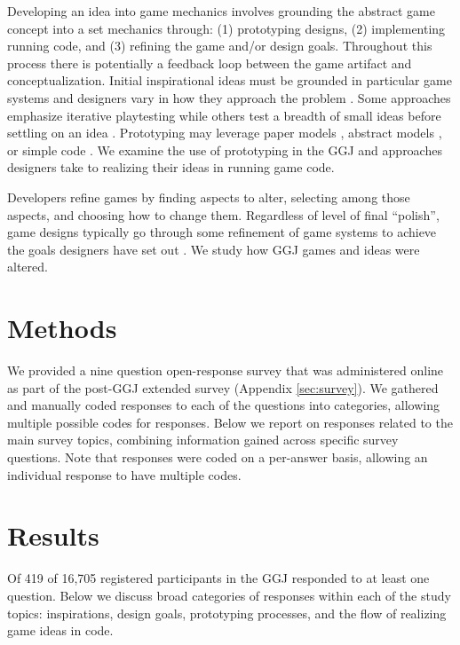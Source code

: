 \documentclass{sig-alternate}
\begin{document}
Developing an idea into game mechanics involves grounding the abstract game concept into a set mechanics through: (1) prototyping designs, (2) implementing running code, and (3) refining the game and/or design goals. Throughout this process there is potentially a feedback loop between the game artifact and conceptualization. Initial inspirational ideas must be grounded in particular game systems and designers vary in how they approach the problem \cite{gabler2005:7day-prototype,manker2011:prototyping,nelson2009:reqanal}. Some approaches emphasize iterative playtesting \cite{fullerton2008:playcentric,schell2008:gamedesign} while others test a breadth of small ideas before settling on an idea \cite{gabler2005:7day-prototype}. Prototyping may leverage paper models \cite{manker2011:prototyping}, abstract models \cite{dormans2011:machinations2,nelson2009:reqanal}, or simple code \cite{gabler2005:7day-prototype}. We examine the use of prototyping in the GGJ and approaches designers take to realizing their ideas in running game code.

Developers refine games by finding aspects to alter, selecting among those aspects, and choosing how to change them. Regardless of level of final ``polish'', game designs typically go through some refinement of game systems to achieve the goals designers have set out \cite{fullerton2008:playcentric,schell2008:gamedesign}. We study how GGJ games and ideas were altered.


\section{Methods}
We provided a nine question open-response survey that was administered online as part of the post-GGJ extended survey (Appendix \ref{sec:survey}). We gathered and manually coded responses to each of the questions into categories, allowing multiple possible codes for responses. Below we report on responses related to the main survey topics, combining information gained across specific survey questions. Note that responses were coded on a per-answer basis, allowing an individual response to have multiple codes.


\section{Results}
Of 419 of 16,705 registered participants in the GGJ responded to at least one question.
Below we discuss broad categories of responses within each of the study topics: inspirations, design goals, prototyping processes, and the flow of realizing game ideas in code.
\end{document}
